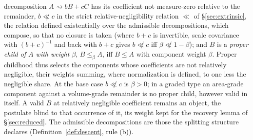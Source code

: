 \begin{defin}
decomposition $A \rightsquigarrow bB + cC$ has its coefficient not measure-zero relative to the remainder, $b \not\ll c$ in the strict relative-negligibility relation $\ll$ of \S\ref{sec:extrinsic}, the relation defined existentially over the admissible decompositions, which compose, so that no closure is taken (where $b + c$ is invertible, scale covariance with $(b+c)^{-1}$ and back with $b + c$ gives $b \not\ll c$ iff $\beta \not\ll 1 - \beta$); and $B$ is a \emph{proper child of $A$ with weight $\beta$}, $B \le_\beta A$, iff $B \le A$ with component weight $\beta$. Proper childhood thus selects the components whose coefficients are not relatively negligible, their weights summing, where normalization is defined, to one less the negligible share.  At the base case $b \not\ll c$ is $\beta > 0$; in a graded type an area-grade component against a volume-grade remainder is no proper child, however valid in itself. A valid $B$ at relatively negligible coefficient remains an object, the postulate blind to that occurrence of it, its weight kept for the recovery lemma of \S\ref{sec:reduced}. The admissible decompositions are those the splitting structure declares (Definition~\ref{def:descent}, rule (b)).

\end{defin}
